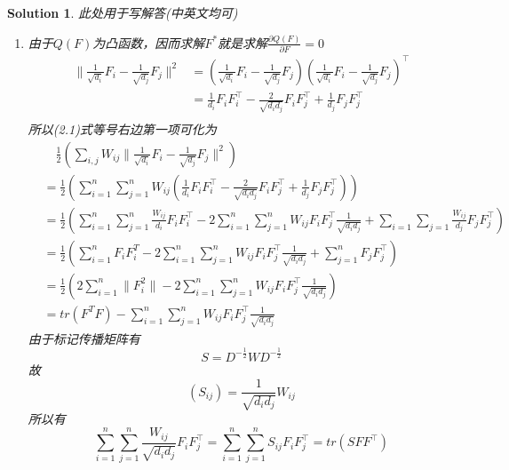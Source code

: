 \documentclass[a4paper,UTF8]{article}
\newtheorem*{solution}{Solution}
\numberwithin{equation}{section}
\begin{document}
\begin{solution}
此处用于写解答(中英文均可)
\begin{enumerate}
\item 由于$Q(F)$为凸函数，因而求解$F^{*}$就是求解$\frac{\partial{Q(F)}}{\partial{F}} = 0$
\begin{equation*}
	\begin{split}
		\| \frac{1}{\sqrt{d_{i}}} F_{i} - \frac{1}{\sqrt{d_{j}}}F_{j} \|^{2} &= (\frac{1}{\sqrt{d_{i}}}F_{i} - \frac{1}{\sqrt{d_{j}}}F_{j})(\frac{1}{\sqrt{d_{i}}}F_{i} - \frac{1}{\sqrt{d_{j}}}F_{j})^{\top} \\
	&= \frac{1}{d_{i}}F_{i}F_{i}^{\top} - \frac{2}{\sqrt{d_{i}d_{j}}}F_{i}F_{j}^{\top} + \frac{1}{d_{j}}F_{j}F_{j}^{\top} \\
	\end{split}
\end{equation*}
​所以(2.1)式等号右边第一项可化为
\begin{equation*}
	\begin{split}
		&\quad \frac{1}{2}\left( \sum_{i,j}W_{ij} \| \frac{1}{\sqrt{d_{i}}}F_{i} - \frac{1}{\sqrt{d_{j}}}F_{j} \|^{2}  \right)\\
		&= \frac{1}{2}\left(\sum_{i=1}^{n}\sum_{j=1}^{n}W_{ij}(\frac{1}{d_{i}}F_{i}F_{i}^{\top} - \frac{2}{\sqrt{d_{i}d_{j}}}F_{i}F_{j}^{\top} + \frac{1}{d_{j}}F_{j}F_{j}^{\top}) \right)\\
		&= \frac{1}{2}\left( \sum_{i=1}^{n}\sum_{j=1}^{n}\frac{W_{ij}}{d_i}F_{i}F_{i}^{\top} - 2\sum_{i=1}^{n}\sum_{j=1}^{n}W_{ij}F_{i}F_{j}^{\top}\frac{1}{\sqrt{d_{i}d_{j}}} + \sum_{i=1}\sum_{j=1}\frac{W_{ij}}{d_j}F_{j}F_{j}^{\top} \right) \\
		&=  \frac{1}{2}\left( \sum_{i=1}^{n}F_{i}F_{i}^{T} - 2\sum_{i=1}^{n}\sum_{j=1}^{n}W_{ij}F_{i}F_{j}^{\top}\frac{1}{\sqrt{d_{i}d_{j}}} + \sum_{j=1}^{n}F_{j}F_{j}^{\top}
		\right) \\
		&= 	\frac{1}{2}\left( 2\sum_{i=1}^{n}\|F_{i}^{2}\| - 2\sum_{i=1}^{n}\sum_{j=1}^{n}W_{ij}F_{i}F_{j}^{\top}\frac{1}{\sqrt{d_{i}d_{j}}}  \right) \\
		&= tr(F^{T}F) - \sum_{i=1}^{n}\sum_{j=1}^{n}W_{ij}F_{i}F_{j}^{\top}\frac{1}{\sqrt{d_{i}d_{j}}}
	\end{split}
\end{equation*}
由于标记传播矩阵有$$S = D^{-\frac{1}{2}}WD^{-\frac{1}{2}}$$
​故$$(S_{ij}) = \frac{1}{\sqrt{d_{i}d_{j}}}W_{ij}$$
所以有$$\sum_{i=1}^{n}\sum_{j=1}^{n}\frac{W_{ij}}{\sqrt{d_{i}d_{j}}}F_{i}F_{j}^{\top} = \sum_{i=1}^{n}\sum_{j=1}^{n}S_{ij}F_{i}F_{j}^{\top}=tr(SFF^{\top})$$


\end{enumerate}
\end{solution}
\end{document}
